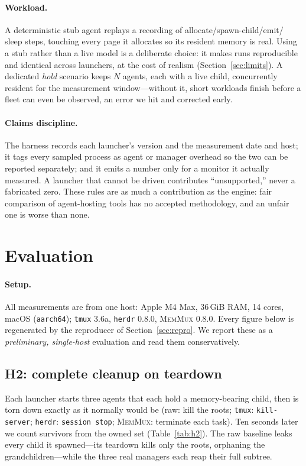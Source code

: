 \documentclass[11pt]{article}
\newcommand{\sys}{\textsc{MemMux}}
\newcommand{\code}[1]{\texttt{#1}}
\begin{document}
\paragraph{Workload.} A deterministic stub agent replays a recording of allocate/spawn-child/emit/
sleep steps, touching every page it allocates so its resident memory is real. Using a stub rather
than a live model is a deliberate choice: it makes runs reproducible and identical across launchers,
at the cost of realism (Section~\ref{sec:limits}). A dedicated \emph{hold} scenario keeps $N$ agents,
each with a live child, concurrently resident for the measurement window---without it, short
workloads finish before a fleet can even be observed, an error we hit and corrected early.

\paragraph{Claims discipline.} The harness records each launcher's version and the measurement date
and host; it tags every sampled process as agent or manager overhead so the two can be reported
separately; and it emits a number only for a monitor it actually measured. A launcher that cannot be
driven contributes ``unsupported,'' never a fabricated zero. These rules are as much a contribution
as the engine: fair comparison of agent-hosting tools has no accepted methodology, and an unfair one
is worse than none.

\section{Evaluation}
\label{sec:eval}

\paragraph{Setup.} All measurements are from one host: Apple M4 Max, 36\,GiB RAM, 14 cores, macOS
(\code{aarch64}); \code{tmux} 3.6a, \code{herdr} 0.8.0, \sys{} 0.8.0. Every figure below is
regenerated by the reproducer of Section~\ref{sec:repro}. We report these as a \emph{preliminary,
single-host} evaluation and read them conservatively.

\subsection{H2: complete cleanup on teardown}

Each launcher starts three agents that each hold a memory-bearing child, then is torn down exactly as
it normally would be (raw: kill the roots; \code{tmux}: \code{kill-server}; \code{herdr}: \code{session
stop}; \sys{}: terminate each task). Ten seconds later we count survivors from the owned set
(Table~\ref{tab:h2}). The raw baseline leaks every child it spawned---its teardown kills only the
roots, orphaning the grandchildren---while the three real managers each reap their full subtree.
\end{document}
